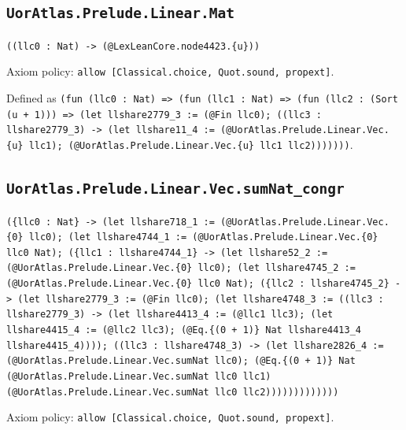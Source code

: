 \documentclass[11pt]{article}
\begin{document}
\subsection*{\texttt{UorAtlas.Prelude.Linear.Mat}}
\noindent\texttt{((llc0 : Nat) -> (@LexLeanCore.node4423.\{u\}))}\par
\noindent Axiom policy: \texttt{allow [Classical.choice, Quot.sound, propext]}.\par
\noindent Defined as \texttt{(fun (llc0 : Nat) => (fun (llc1 : Nat) => (fun (llc2 : (Sort (u + 1))) => (let llshare2779\_3 := (@Fin llc0); ((llc3 : llshare2779\_3) -> (let llshare11\_4 := (@UorAtlas.Prelude.Linear.Vec.\{u\} llc1); (@UorAtlas.Prelude.Linear.Vec.\{u\} llc1 llc2)))))))}.\par
\subsection*{\texttt{UorAtlas.Prelude.Linear.Vec.sumNat\_congr}}
\noindent\texttt{(\{llc0 : Nat\} -> (let llshare718\_1 := (@UorAtlas.Prelude.Linear.Vec.\{0\} llc0); (let llshare4744\_1 := (@UorAtlas.Prelude.Linear.Vec.\{0\} llc0 Nat); (\{llc1 : llshare4744\_1\} -> (let llshare52\_2 := (@UorAtlas.Prelude.Linear.Vec.\{0\} llc0); (let llshare4745\_2 := (@UorAtlas.Prelude.Linear.Vec.\{0\} llc0 Nat); (\{llc2 : llshare4745\_2\} -> (let llshare2779\_3 := (@Fin llc0); (let llshare4748\_3 := ((llc3 : llshare2779\_3) -> (let llshare4413\_4 := (@llc1 llc3); (let llshare4415\_4 := (@llc2 llc3); (@Eq.\{(0 + 1)\} Nat llshare4413\_4 llshare4415\_4)))); ((llc3 : llshare4748\_3) -> (let llshare2826\_4 := (@UorAtlas.Prelude.Linear.Vec.sumNat llc0); (@Eq.\{(0 + 1)\} Nat (@UorAtlas.Prelude.Linear.Vec.sumNat llc0 llc1) (@UorAtlas.Prelude.Linear.Vec.sumNat llc0 llc2)))))))))))))}\par
\noindent Axiom policy: \texttt{allow [Classical.choice, Quot.sound, propext]}.\par
\end{document}
